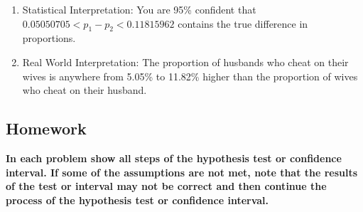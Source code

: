 \documentclass[]{book}
\begin{document}
\begin{enumerate}
\def\labelenumi{\arabic{enumi}.}
\setcounter{enumi}{3}
\item
  Statistical Interpretation: You are 95\% confident that \(0.05050705<p_1-p_2<0.11815962\) contains the true difference in proportions.
\item
  Real World Interpretation: The proportion of husbands who cheat on their wives is anywhere from 5.05\% to 11.82\% higher than the proportion of wives who cheat on their husband.
\end{enumerate}

\hypertarget{homework-26}{%
\subsection{Homework}\label{homework-26}}

\textbf{In each problem show all steps of the hypothesis test or confidence interval. If some of the assumptions are not met, note that the results of the test or interval may not be correct and then continue the process of the hypothesis test or confidence interval.}
\end{document}
